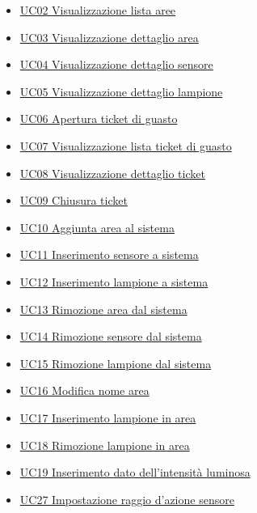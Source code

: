 \begin{itemize}
    \item \hyperref[uc:02]{UC02 Visualizzazione lista aree}
    \item \hyperref[uc:03]{UC03 Visualizzazione dettaglio area}
    \item \hyperref[uc:04]{UC04 Visualizzazione dettaglio sensore}
    \item \hyperref[uc:05]{UC05 Visualizzazione dettaglio lampione}
    \item \hyperref[uc:06]{UC06 Apertura ticket di guasto}
    \item \hyperref[uc:07]{UC07 Visualizzazione lista ticket di guasto}
    \item \hyperref[uc:08]{UC08 Visualizzazione dettaglio ticket}
    \item \hyperref[uc:09]{UC09 Chiusura ticket}
    \item \hyperref[uc:10]{UC10 Aggiunta area al sistema}
    \item \hyperref[uc:11]{UC11 Inserimento sensore a sistema}
    \item \hyperref[uc:12]{UC12 Inserimento lampione a sistema}
    \item \hyperref[uc:13]{UC13 Rimozione area dal sistema}
    \item \hyperref[uc:14]{UC14 Rimozione sensore dal sistema}
    \item \hyperref[uc:15]{UC15 Rimozione lampione dal sistema}
    \item \hyperref[uc:16]{UC16 Modifica nome area}
    \item \hyperref[uc:17]{UC17 Inserimento lampione in area}
    \item \hyperref[uc:18]{UC18 Rimozione lampione in area}
    \item \hyperref[uc:19]{UC19 Inserimento dato dell'intensità luminosa}
    \item \hyperref[uc:27]{UC27 Impostazione raggio d'azione sensore}
\end{itemize}